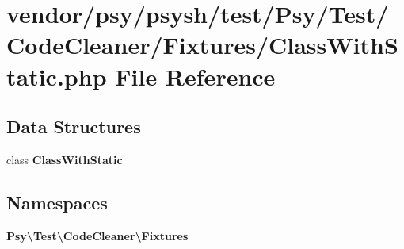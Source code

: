 \section{vendor/psy/psysh/test/\+Psy/\+Test/\+Code\+Cleaner/\+Fixtures/\+Class\+With\+Static.php File Reference}
\label{_class_with_static_8php}
\subsection*{Data Structures}
\begin{DoxyCompactItemize}
\item 
class {\bf Class\+With\+Static}
\end{DoxyCompactItemize}
\subsection*{Namespaces}
\begin{DoxyCompactItemize}
\item 
 {\bf Psy\textbackslash{}\+Test\textbackslash{}\+Code\+Cleaner\textbackslash{}\+Fixtures}
\end{DoxyCompactItemize}
